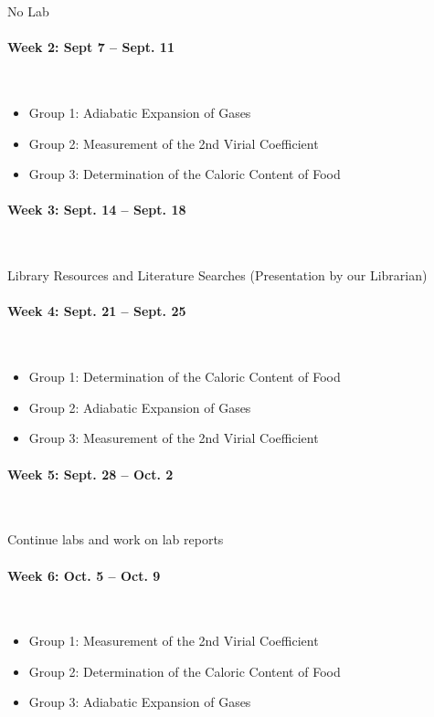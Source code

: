 \documentclass[12pt, letterpaper]{article}
\begin{document}
No Lab

\paragraph{Week 2: Sept 7 -- Sept. 11}~

\begin{itemize}
	\item Group 1: Adiabatic Expansion of Gases
	\item Group 2: Measurement of the 2nd Virial Coefficient
	\item Group 3: Determination of the Caloric Content of Food
\end{itemize}

\paragraph{Week 3: Sept. 14 -- Sept. 18}~

Library Resources and Literature Searches (Presentation by our Librarian)

\paragraph{Week 4: Sept. 21 -- Sept. 25}~

\begin{itemize}
	\item Group 1: Determination of the Caloric Content of Food
	\item Group 2: Adiabatic Expansion of Gases
	\item Group 3: Measurement of the 2nd Virial Coefficient
\end{itemize}

\paragraph{Week 5: Sept. 28 -- Oct. 2}~

Continue labs and work on lab reports

\paragraph{Week 6: Oct. 5 -- Oct. 9}~

\begin{itemize}
	\item Group 1: Measurement of the 2nd Virial Coefficient
	\item Group 2: Determination of the Caloric Content of Food
	\item Group 3: Adiabatic Expansion of Gases
\end{itemize}
\end{document}

